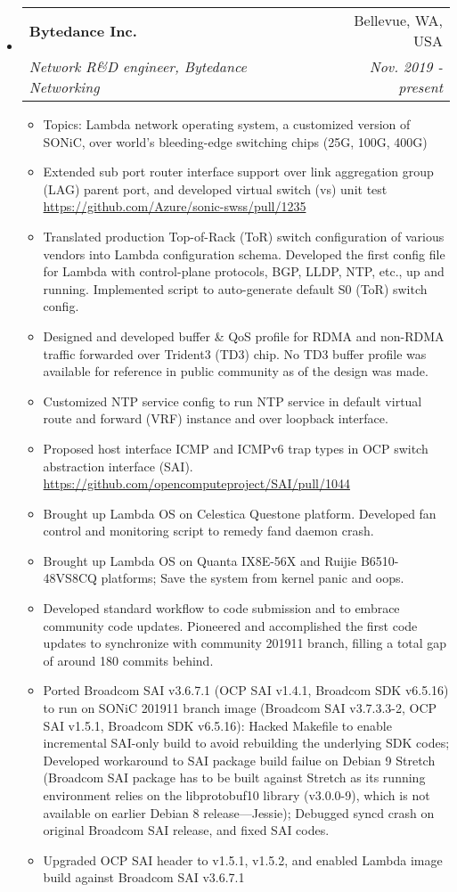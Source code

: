 \documentclass[letterpaper,11pt]{article}
\makeatletter
\newcommand{\ressubheading}[4]{
\begin{tabular*}{6.69in}{l@{\extracolsep{\fill}}r}
        \textbf{#1} & #2 \\
        \textit{#3} & \textit{#4} \\
\end{tabular*}\vspace{-6pt}
}
\newcommand{\resitem}[1]{\item #1 \vspace{-2pt}}
\makeatother
\begin{document}
\begin{CJK}{UTF8}{gbsn}
\begin{itemize}
\item
  \ressubheading{Bytedance Inc.}{Bellevue, WA, USA}
  {Network R\&D engineer, Bytedance Networking}{Nov. 2019 - present}
  \begin{itemize}
  \resitem{Topics: Lambda network operating system, a customized version of SONiC, over world's bleeding-edge switching chips (25G, 100G, 400G)}
  \resitem{Extended sub port router interface support over link aggregation group (LAG) parent port,
  and developed virtual switch (vs) unit test \url{https://github.com/Azure/sonic-swss/pull/1235}}
  \resitem{Translated production Top-of-Rack (ToR) switch configuration of various vendors into Lambda configuration schema.
  Developed the first config file for Lambda with control-plane protocols, BGP, LLDP, NTP, etc., up and running.
  Implemented script to auto-generate default S0 (ToR) switch config.}
  \resitem{Designed and developed buffer \& QoS profile for RDMA and non-RDMA traffic forwarded over Trident3 (TD3) chip.
  No TD3 buffer profile was available for reference in public community as of the design was made.}
  \resitem{Customized NTP service config to run NTP service in default virtual route and forward (VRF) instance and over loopback interface.}
  \resitem{Proposed host interface ICMP and ICMPv6 trap types in OCP switch abstraction interface (SAI).
  \url{https://github.com/opencomputeproject/SAI/pull/1044}}
  \resitem{Brought up Lambda OS on Celestica Questone platform. Developed fan control and monitoring script to remedy fand daemon crash.}
  \resitem{Brought up Lambda OS on Quanta IX8E-56X and Ruijie B6510-48VS8CQ platforms; Save the system from kernel panic and oops.}
  \resitem{Developed standard workflow to code submission and to embrace community code updates.
  Pioneered and accomplished the first code updates to synchronize with community 201911 branch, filling a total gap of around 180 commits behind.}
  \resitem{Ported Broadcom SAI v3.6.7.1 (OCP SAI v1.4.1, Broadcom SDK v6.5.16) to run on SONiC 201911 branch image
  (Broadcom SAI v3.7.3.3-2, OCP SAI v1.5.1, Broadcom SDK v6.5.16):
  Hacked Makefile to enable incremental SAI-only build to avoid rebuilding the underlying SDK codes;
  Developed workaround to SAI package build failue on Debian 9 Stretch (Broadcom SAI package has to be built against Stretch
  as its running environment relies on the libprotobuf10 library (v3.0.0-9), which is not available on earlier Debian 8 release---Jessie);
  Debugged syncd crash on original Broadcom SAI release, and fixed SAI codes.}
  \resitem{Upgraded OCP SAI header to v1.5.1, v1.5.2, and enabled Lambda image build against Broadcom SAI v3.6.7.1}

\end{itemize}
\end{itemize}
\end{CJK}
\end{document}

